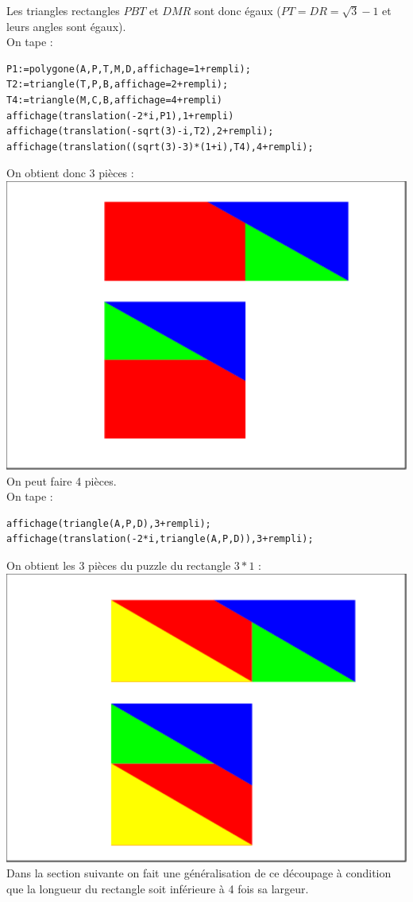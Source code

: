 \documentclass[a4paper,11pt]{book}
\begin{document}
Les triangles rectangles $PBT$ et $DMR$ sont donc \'egaux ($PT=DR=\sqrt 3-1$ et 
leurs angles sont \'egaux).\\
On tape :\\
\begin{verbatim}
P1:=polygone(A,P,T,M,D,affichage=1+rempli);
T2:=triangle(T,P,B,affichage=2+rempli);
T4:=triangle(M,C,B,affichage=4+rempli)
affichage(translation(-2*i,P1),1+rempli)
affichage(translation(-sqrt(3)-i,T2),2+rempli);
affichage(translation((sqrt(3)-3)*(1+i),T4),4+rempli);
\end{verbatim}
On obtient donc 3 pi\`eces :\\
\includegraphics[width=\textwidth]{carresqrt32}\\

On peut faire 4 pi\`eces.\\
On tape :\\
\begin{verbatim}
affichage(triangle(A,P,D),3+rempli);
affichage(translation(-2*i,triangle(A,P,D)),3+rempli);
\end{verbatim}
On obtient les 3 pi\`eces du puzzle du rectangle $3*1$ :\\
\includegraphics[width=\textwidth]{carresqrt34}\\
Dans la section suivante on fait une g\'en\'eralisation de ce d\'ecoupage \`a 
condition que la longueur du rectangle soit inf\'erieure \`a 4 fois sa largeur.
\end{document}
